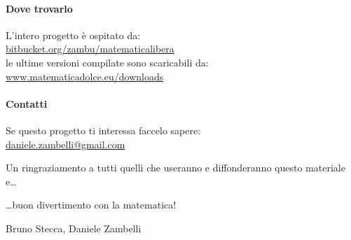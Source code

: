 \paragraph {Dove trovarlo} 
L'intero progetto è ospitato da: \\
\href{https://bitbucket.org/zambu/matematicalibera}
{bitbucket.org/zambu/matematicalibera}\\
le ultime versioni compilate sono scaricabili da: \\
\href{https://www.matematicadolce.eu/downloads}
{www.matematicadolce.eu/downloads}

\paragraph {Contatti} 
Se questo progetto ti interessa faccelo sapere: \\
\href{mailto:daniele.zambelli@gmail.com}{daniele.zambelli@gmail.com}

\vspace{2em}
\noindent Un ringraziamento a tutti quelli che useranno e 
diffonderanno questo materiale e\dots

\dots buon divertimento con la matematica!
\begin{flushright}
Bruno Stecca, Daniele Zambelli
\end{flushright}
